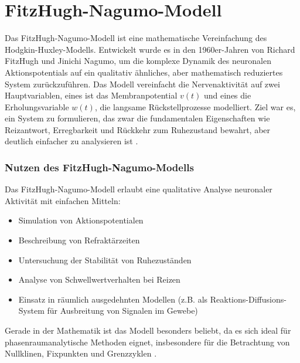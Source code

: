 \section{FitzHugh-Nagumo-Modell}
%
Das FitzHugh-Nagumo-Modell ist eine mathematische Vereinfachung des Hodgkin-Huxley-Modells. Entwickelt wurde es in den 1960er-Jahren von Richard FitzHugh und Jinichi Nagumo, um die komplexe Dynamik des neuronalen Aktionspotentials auf ein qualitativ ähnliches, aber mathematisch reduziertes System zurückzuführen.
%
%
%
Das Modell vereinfacht die Nervenaktivität auf zwei Hauptvariablen, eines ist das Membranpotential $v(t)$ und eines die Erholungsvariable $w(t)$, die langsame Rückstellprozesse modelliert.
%
%
Ziel war es, ein System zu formulieren, das zwar die fundamentalen Eigenschaften wie Reizantwort, Erregbarkeit und Rückkehr zum Ruhezustand bewahrt, aber deutlich einfacher zu analysieren ist 
%
%
\cite{nerven:InaLammers.31.08.2015}.
\subsubsection{Nutzen des FitzHugh-Nagumo-Modells}
Das FitzHugh-Nagumo-Modell erlaubt eine qualitative Analyse neuronaler Aktivität mit einfachen Mitteln:
\begin{itemize}
    \item Simulation von Aktionspotentialen
    \item Beschreibung von Refraktärzeiten
    \item Untersuchung der Stabilität von Ruhezuständen
    \item Analyse von Schwellwertverhalten bei Reizen
    \item Einsatz in räumlich ausgedehnten Modellen (z.B. als Reaktions-Diffusions-System für Ausbreitung von Signalen im Gewebe)
\end{itemize}

Gerade in der Mathematik ist das Modell besonders beliebt, da es sich ideal für phasenraumanalytische Methoden eignet,
insbesondere für die Betrachtung von Nullklinen, Fixpunkten und Grenzzyklen 
%
%
%
\cite{nerven:InaLammers.31.08.2015}.
